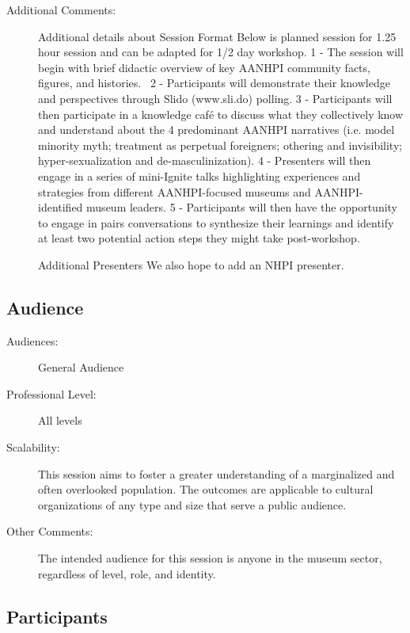 \documentclass{report}
\begin{document}
\begin{description}
                    \item [Additional Comments: ]Additional details about Session Format
Below is planned session for 1.25 hour session and can be adapted for 1/2 day workshop.
1 - The session will begin with brief didactic overview of key AANHPI community facts, figures, and histories. 
2 - Participants will demonstrate their knowledge and perspectives through Slido (www.sli.do) polling.
3 - Participants will then participate in a knowledge café to discuss what they collectively know and understand about the 4 predominant AANHPI narratives (i.e. model minority myth; treatment as perpetual foreigners; othering and invisibility; hyper-sexualization and de-masculinization).
4 - Presenters will then engage in a series of mini-Ignite talks highlighting experiences and strategies from different AANHPI-focused museums and AANHPI-identified museum leaders.
5 - Participants will then have the opportunity to engage in pairs conversations to synthesize their learnings and identify at least two potential action steps they might take post-workshop.

Additional Presenters
We also hope to add an NHPI presenter. 




                \end{description}
              \subsection*{Audience}
                \begin{description}
                  \item [Audiences:]General Audience~
                  \item[Professional Level:]All levels~
                \item[Scalability:] This session aims to foster a greater understanding of a marginalized and often overlooked population. The outcomes are applicable to cultural organizations of any type and size that serve a public audience. 

							
              \item[Other Comments:] The intended audience for this session is anyone in the museum sector, regardless of level, role, and identity.
              \end{description}
            \subsection*{Participants}
\end{document}
